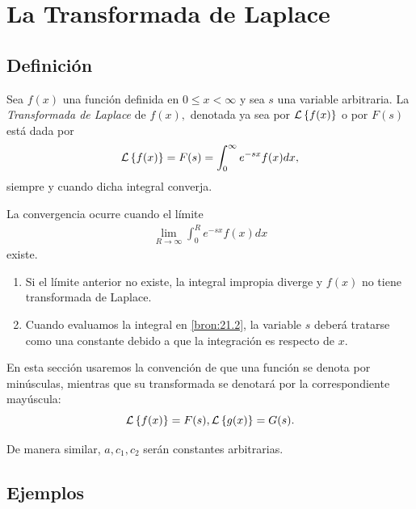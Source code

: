 
%


\section{La Transformada de Laplace}

\subsection{Definici\'on}


 Sea $f(x)$ una funci\'on definida en $0\leq x < \infty$ y sea $s$ una variable arbitraria.  La \emph{Transformada de Laplace} de $f(x),$ denotada ya sea por $\mathcal{L}\left\{ f(x) \right\}$ o por $F(s)$ está dada por
 \[
  \label{bron:21.1}
  \mathcal{L}\left\{ f(x) \right\}=F(s)=\int_{0}^{\infty}e^{-sx}f(x)dx,
 \]
siempre y cuando dicha integral converja.


{}
La convergencia ocurre cuando el límite
\begin{align}
\label{bron:21.2}
\lim_{R\to \infty}
\int_{0}^{R} e^{-sx}f(x)dx
\end{align}
existe.

{}
\begin{observacion}
 \begin{enumerate}
  \item Si el límite anterior no existe, la integral impropia diverge y $f(x)$ no tiene transformada de Laplace.
  \item Cuando evaluamos la integral en \eqref{bron:21.2}, la variable $s$ deberá tratarse como una constante debido a que la integración es respecto de $x.$
 \end{enumerate}

\end{observacion}




 En esta secci\'on usaremos la convención de que una función se denota por minúsculas, mientras que su transformada se denotará por la correspondiente mayúscula:
 $$\mathcal{L}\left\{ f(x) \right\}=F(s),\mathcal{L}\left\{ g(x) \right\}=G(s).$$

 De manera similar, $a,c_{1},c_{2}$ serán constantes arbitrarias.


\subsection{Ejemplos}


